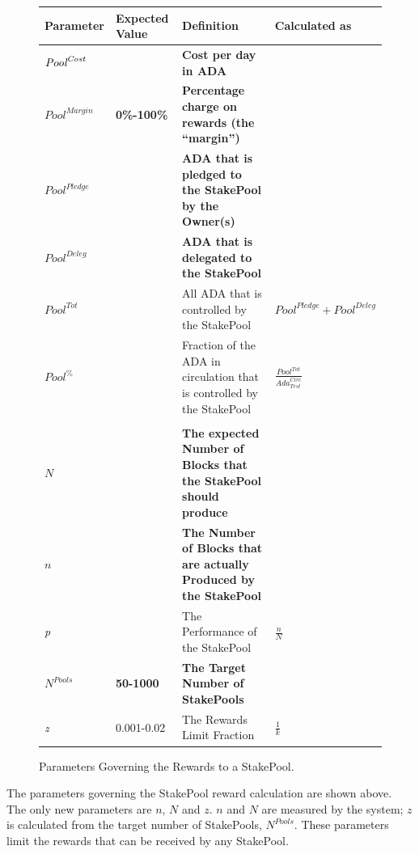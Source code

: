\documentclass[11pt,a4paper,dvipsnames,twosided,final]{article}
\newcommand{\ada}{ADA{}}
\begin{document}
\begin{figure}[h!]
\begin{center}
\begin{tabular}{||l|l|p{6cm}|l||}
  \hline \hline
\textbf{Parameter} & \textbf{Expected Value} & \textbf{Definition} & \textbf{Calculated as} \\\hline
  \textbf{\color{red} $\textit{\textit{Pool}}^{\textit{Cost}}$} &  & \textbf{\color{red} Cost per day in \ada{}} & \\\hline
\textbf{\color{red} ${\textit{Pool}}^{\textit{Margin}}$} &  \textbf{\color{red} 0\%-100\%} & \textbf{\color{red} Percentage charge on rewards (the ``margin'')} & \\\hline
\textbf{\color{red} ${\textit{Pool}}^\textit{Pledge}$} & & \textbf{\color{red} \ada{} that is pledged to the StakePool by the Owner(s)} & \\\hline
\textbf{\color{blue} ${\textit{Pool}}^\textit{Deleg}$} & & \textbf{\color{blue} \ada{} that is delegated to the StakePool} & \\\hline
${\textit{Pool}}^{Tot}$ & & All \ada{} that is controlled by the StakePool & ${\textit{Pool}}^\textit{Pledge} + {\textit{Pool}}^\textit{Deleg}$ \\\hline
  ${\textit{Pool}}^\%$ & & Fraction of the \ada{} in circulation that is controlled by the StakePool & {\large $\frac{{\textit{Pool}}^{Tot}}{\textit{Ada}^{\textit{Circ}}_{\textit{Test}}}$} \\\hline
&&&  \\\hline
\textbf{\color{cyan} $N$} & & \textbf{\color{cyan} The expected Number of Blocks that the StakePool should produce} & \\\hline
\textbf{\color{cyan} $n$} & & \textbf{\color{cyan} The Number of Blocks that are actually Produced by the StakePool} & \\\hline
\emph{p} & & The Performance of the StakePool & $\frac{n}{N}$ \\\hline
\textbf{\color{green} $N^{\textit{Pools}}$} &\textbf{\color{green} 50-1000} & \textbf{\color{green} The Target Number of StakePools} & \\\hline
\emph{z} & 0.001-0.02 & The Rewards Limit Fraction & $\frac{1}{k}$ \\\hline
\hline
\end{tabular}
\end{center}
\caption{Parameters Governing the Rewards to a StakePool.}
\label{fig:rewards}
\end{figure}

\noindent
The parameters governing the StakePool reward calculation are shown above.  The only new
parameters are $n$, $N$ and $z$. $n$ and $N$ are measured by the system; $z$ is calculated from the
target number of StakePools, $N^{\textit{Pools}}$.  These parameters limit the rewards that can be received by any StakePool.
\end{document}
